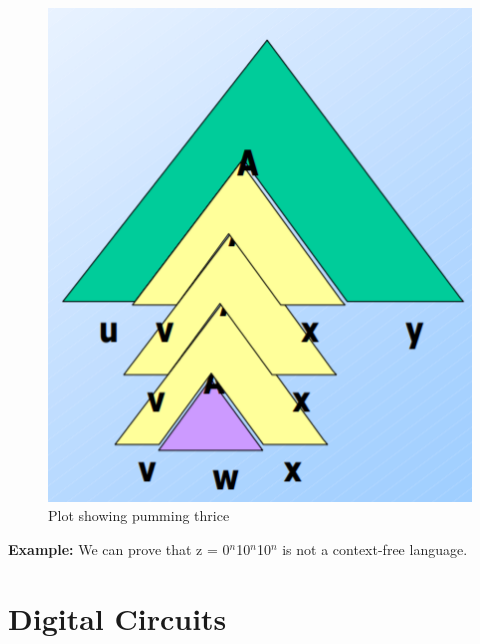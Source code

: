 \documentclass{report}
\begin{document}
\begin{figure}[h]
    \centering
    \includegraphics[scale=0.5]{pump3.png}
    \caption{Plot showing pumming thrice}
    \label{fig:my_label}
\end{figure} 
\textbf{Example:} We can prove that z = 0$^n$10$^n$10$^n$ is not a context-free language.


\chapter{Digital Circuits}
\end{document}
